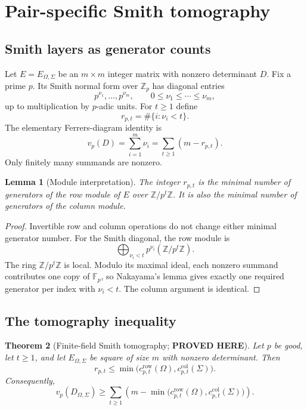 \documentclass[11pt]{article}
\newtheorem{theorem}{Theorem}[section]
\newtheorem{lemma}[theorem]{Lemma}
\theoremstyle{definition}
\theoremstyle{remark}
\newcommand{\Z}{\mathbb Z}
\newcommand{\F}{\mathbb F}
\newcommand{\vp}{v_p}
\newcommand{\crow}{c^{\mathrm{row}}}
\newcommand{\ccol}{c^{\mathrm{col}}}
\newcommand{\statusproved}{\textcolor{statusgreen}{\textbf{PROVED HERE}}}
\begin{document}
\section{Pair-specific Smith tomography}

\subsection{Smith layers as generator counts}

Let $E=E_{\Omega,\Sigma}$ be an $m\times m$ integer matrix with nonzero determinant $D$.  Fix a prime $p$.  Its Smith normal form over $\Z_p$ has diagonal entries
\[
p^{\nu_1},\ldots,p^{\nu_m},
\qquad 0\le\nu_1\le\cdots\le\nu_m,
\]
up to multiplication by $p$-adic units.  For $t\ge1$ define
\begin{equation}\label{eq:smith-rank-layer}
r_{p,t}=\#\{i:\nu_i<t\}.
\end{equation}
The elementary Ferrers-diagram identity is
\begin{equation}\label{eq:ferrers}
\vp(D)=\sum_{i=1}^m\nu_i
=\sum_{t\ge1}(m-r_{p,t}).
\end{equation}
Only finitely many summands are nonzero.

\begin{lemma}[Module interpretation]\label{lem:module-generators}
The integer $r_{p,t}$ is the minimal number of generators of the row module of $E$ over $\Z/p^t\Z$.  It is also the minimal number of generators of the column module.
\end{lemma}

\begin{proof}
Invertible row and column operations do not change either minimal generator number.  For the Smith diagonal, the row module is
\[
\bigoplus_{\nu_i<t}p^{\nu_i}(\Z/p^t\Z).
\]
The ring $\Z/p^t\Z$ is local.  Modulo its maximal ideal, each nonzero summand contributes one copy of $\F_p$, so Nakayama's lemma gives exactly one required generator per index with $\nu_i<t$.  The column argument is identical.
\end{proof}

\subsection{The tomography inequality}

\begin{theorem}[Finite-field Smith tomography; \statusproved]\label{thm:smith-tomography}
Let $p$ be good, let $t\ge1$, and let $E_{\Omega,\Sigma}$ be square of size $m$ with nonzero determinant.  Then
\begin{equation}\label{eq:rank-tomography}
r_{p,t}\le
\min\bigl(\crow_{p,t}(\Omega),\ccol_{p,t}(\Sigma)\bigr).
\end{equation}
Consequently,
\begin{equation}\label{eq:valuation-tomography}
\vp(D_{\Omega,\Sigma})
\ge
\sum_{t\ge1}
\left(m-
\min\bigl(\crow_{p,t}(\Omega),\ccol_{p,t}(\Sigma)\bigr)
\right).
\end{equation}
\end{theorem}
\end{document}
